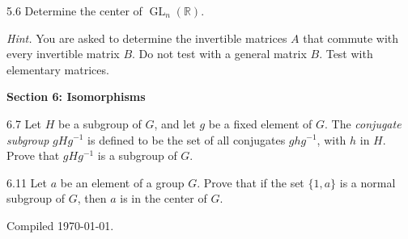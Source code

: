 \documentclass[11pt]{article}
\newcommand{\sectionheading}[1]{%
  \vspace{0.25em}
  {\color{darkgray}\large\bfseries #1}\par
}
\begin{document}
\begin{exercise}{5.6}
Determine the center of $\operatorname{GL}_n(\mathbb{R})$.

\textit{Hint.} You are asked to determine the invertible matrices $A$ that
commute with every invertible matrix $B$. Do not test with a general matrix
$B$. Test with elementary matrices.
\end{exercise}

\sectionheading{Section 6: Isomorphisms}

\begin{exercise}{6.7}
Let $H$ be a subgroup of $G$, and let $g$ be a fixed element of $G$. The
\emph{conjugate subgroup} $gHg^{-1}$ is defined to be the set of all
conjugates $ghg^{-1}$, with $h$ in $H$. Prove that $gHg^{-1}$ is a
subgroup of $G$.
\end{exercise}

\begin{exercise}{6.11}
Let $a$ be an element of a group $G$. Prove that if the set $\{1,a\}$ is
a normal subgroup of $G$, then $a$ is in the center of $G$.
\end{exercise}

\vfill
{\small\color{darkgray}Compiled \today.}
\end{document}

